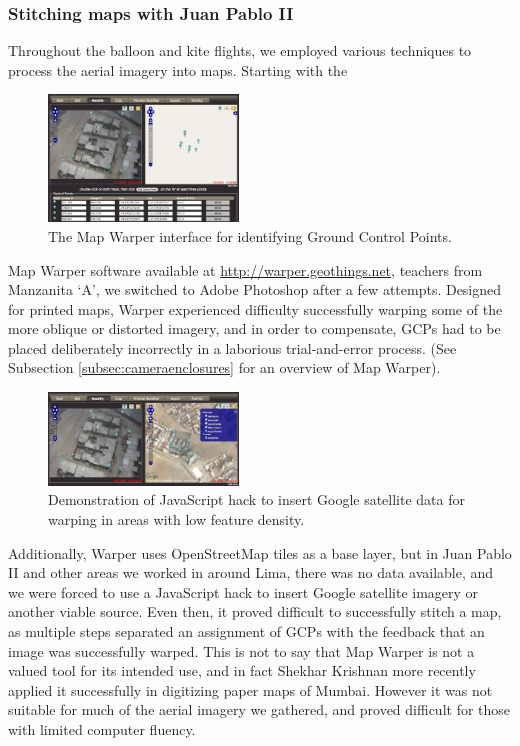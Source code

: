 \documentclass[11pt,oneside,notitlepage]{report}
\begin{document}
\subsubsection{Stitching maps with Juan Pablo II}
\label{subsec:stitchingjp2}

Throughout the balloon and kite flights, we employed various techniques to process the aerial imagery into maps. Starting with the \begin{figure}
	\begin{flushright}
		\includegraphics[width=0.45\textwidth]{images/map-warper.png}
		\caption{The Map Warper interface for identifying Ground Control Points. \cite{waters2009warper}}
	\end{flushright}
\end{figure} Map Warper software available at \url{http://warper.geothings.net}, teachers from Manzanita `A', we switched to Adobe Photoshop after a few attempts. Designed for printed maps, Warper experienced difficulty successfully warping some of the more oblique or distorted imagery, and in order to compensate, GCPs had to be placed deliberately incorrectly in a laborious trial-and-error process. (See Subsection \ref{subsec:cameraenclosures} for an overview of Map Warper). \begin{figure}
	\begin{flushright}
		\includegraphics[width=0.45\textwidth]{images/map-warper-hack.png}
		\caption{Demonstration of JavaScript hack to insert Google satellite data for warping in areas with low feature density. \cite{waters2009warper}}
	\end{flushright}
\end{figure}Additionally, Warper uses OpenStreetMap tiles as a base layer, but in Juan Pablo II and other areas we worked in around Lima, there was no data available, and we were forced to use a JavaScript hack to insert Google satellite imagery or another viable source. Even then, it proved difficult to successfully stitch a map, as multiple steps separated an assignment of GCPs with the feedback that an image was successfully warped. This is not to say that Map Warper is not a valued tool for its intended use, and in fact Shekhar Krishnan more recently applied it successfully in digitizing paper maps of Mumbai. However it was not suitable for much of the aerial imagery we gathered, and proved difficult for those with limited computer fluency.
\end{document}
